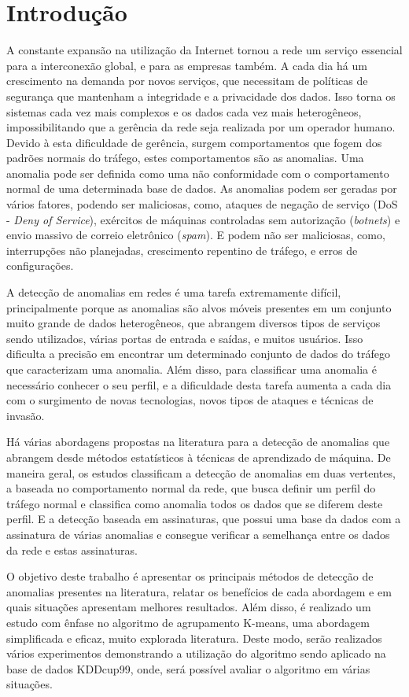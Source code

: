 \chapter{Introdução}%
\indent A constante expansão na utilização da Internet tornou a rede um serviço essencial para a interconexão global, e para as empresas também. A cada dia há um crescimento na demanda por novos serviços, que necessitam de políticas de segurança que mantenham a integridade e a privacidade dos dados. Isso torna os sistemas cada vez mais complexos e os dados cada vez mais heterogêneos, impossibilitando que a gerência da rede seja realizada por um operador humano. Devido à esta dificuldade de gerência, surgem comportamentos que fogem dos padrões normais do tráfego, estes comportamentos são as anomalias. Uma anomalia pode ser definida como uma não conformidade com o comportamento normal de uma determinada base de dados. As anomalias podem ser geradas por vários fatores, podendo ser maliciosas, como, ataques de negação de serviço (DoS - \textit{Deny of Service}), exércitos de máquinas controladas sem autorização (\textit{botnets}) e envio massivo de correio eletrônico (\textit{spam}). E podem não ser maliciosas, como, interrupções não planejadas, crescimento repentino de tráfego, e erros de configurações.

\indent A detecção de anomalias em redes é uma tarefa extremamente difícil, principalmente porque as anomalias são alvos móveis presentes em um conjunto muito grande de dados heterogêneos, que abrangem diversos tipos de serviços sendo utilizados, várias portas de entrada e saídas, e muitos usuários. Isso dificulta a precisão em encontrar um determinado conjunto de dados do tráfego que caracterizam uma anomalia. Além disso, para classificar uma anomalia é necessário conhecer o seu perfil, e a dificuldade desta tarefa aumenta a cada dia com o surgimento de novas tecnologias, novos tipos de ataques e técnicas de invasão.

\indent Há várias abordagens propostas na literatura para a detecção de anomalias que abrangem desde métodos estatísticos à técnicas de aprendizado de máquina. De maneira geral, os estudos classificam a detecção de anomalias em duas vertentes, a baseada no comportamento normal da rede, que busca definir um perfil do tráfego normal e classifica como anomalia todos os dados que se diferem deste perfil. E a detecção baseada em assinaturas, que possui uma base da dados com a assinatura de várias anomalias e consegue verificar a semelhança entre os dados da rede e estas assinaturas.

\indent O objetivo deste trabalho é apresentar os principais métodos de detecção de anomalias presentes na literatura, relatar os benefícios de cada abordagem e em quais situações apresentam melhores resultados. Além disso, é realizado um estudo com ênfase no algoritmo de agrupamento K-means, uma abordagem simplificada e eficaz, muito explorada literatura. Deste modo, serão realizados vários experimentos demonstrando a utilização do algoritmo sendo aplicado na base de dados KDDcup99, onde, será possível avaliar o algoritmo em várias situações.
